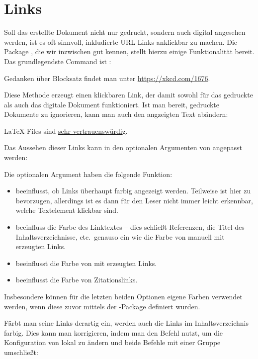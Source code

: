 \section{Links}
Soll das erstellte Dokument nicht nur gedruckt, sondern auch digital angesehen werden, ist es oft sinnvoll, inkludierte URL-Links anklickbar zu machen.
Die Package , die wir inzwischen gut kennen, stellt hierzu einige Funktionalität bereit.
Das grundlegendste Command ist :
\begin{latexlisting}
	Gedanken über Blocksatz findet man unter \url{https://xkcd.com/1676}.
\end{latexlisting}
Diese Methode erzeugt einen klickbaren Link, der damit sowohl für das gedruckte als auch das digitale Dokument funktioniert.
Ist man bereit, gedruckte Dokumente zu ignorieren, kann man auch den angzeigten Text abändern:
\begin{latexlisting}
	\LaTeX{}-Files sind \href{https://xkcd.com/1301}{sehr vertrauenswürdig}.
\end{latexlisting}
Das Aussehen dieser Links kann in den optionalen Argumenten von  angepasst werden:
\begin{latexlisting}
	\usepackage[
		colorlinks=true,
		linkcolor=black,
		urlcolor=red,
		citecolor=purple,
	]{hyperref}
\end{latexlisting}
Die optionalen Argument haben die folgende Funktion:
\begin{itemize}
	\item {} beeinflusst, ob Links überhaupt farbig angezeigt werden.
	Teilweise ist hier  zu bevorzugen, allerdings ist es dann für den Leser nicht immer leicht erkennbar, welche Textelement klickbar sind.
	\item {} beeinfluss die Farbe des Linktextes -- dies schließt Referenzen, die Titel des Inhaltsverzeichnisse, etc.\ genauso ein wie die Farbe von manuell mit  erzeugten Links.
	\item {} beeinflusst die Farbe von mit  erzeugten Links.
	\item {} beeinflusst die Farbe von Zitationslinks.
\end{itemize}
Insbesondere können für die letzten beiden Optionen eigene Farben verwendet werden, wenn diese zuvor mittels der -Package definiert wurden.
\begin{latexlisting}
	\usepackage{xcolor}
\end{latexlisting}
Färbt man seine Links derartig ein, werden auch die Links im Inhaltsverzeichnis farbig.
Dies kann man korrigieren, indem man den Befehl  nutzt, um die Konfiguration von  lokal zu ändern und beide Befehle mit einer Gruppe umschließt:
\begin{latexlisting}
	{
		\hypersetup{linkcolor=black}
		\tableofcontents
	}
\end{latexlisting}

